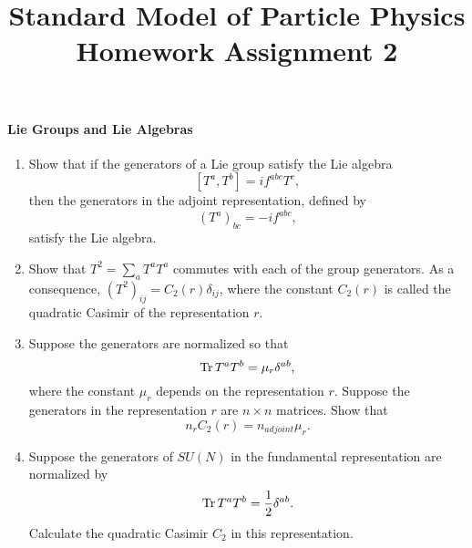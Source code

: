 \documentclass[letterpaper,11pt]{article}
\title{Standard Model of Particle Physics \\ Homework Assignment 2}
\begin{document}
\maketitle

\paragraph*{Lie Groups and Lie Algebras}
\begin{enumerate}
  \item Show that if the generators of a Lie group satisfy the Lie algebra
  \begin{equation*}
    \left[ T^a, T^b \right] = i f^{abc} T^c,
  \end{equation*}
  then the generators in the adjoint representation, defined by
  \begin{equation*}
    (T^a)_{bc} = -i f^{abc},
  \end{equation*}
  satisfy the Lie algebra.
  \item Show that $T^2 = \sum_a T^a T^a$ commutes with each of the group generators. As a consequence, $(T^2)_{ij} = C_2(r) \delta_{ij}$, where the constant $C_2(r)$ is called the quadratic Casimir of the representation $r$.
  \item Suppose the generators are normalized so that
  \begin{equation*}
    \hbox{Tr}\, T^a T^b = \mu_r \delta^{ab},
  \end{equation*}
  where the constant $\mu_r$ depends on the representation $r$. Suppose the generators in the representation $r$ are $n \times n$ matrices. Show that
  \begin{equation*}
    n_r C_2(r) = n_{adjoint} \mu_r.
  \end{equation*}
  \item Suppose the generators of $SU(N)$ in the fundamental representation are normalized by
  \begin{equation*}
    \hbox{Tr}\, T^a T^b = \frac{1}{2} \delta^{ab}.
  \end{equation*}
  Calculate the quadratic Casimir $C_2$ in this representation.
\end{enumerate}
\end{document}

